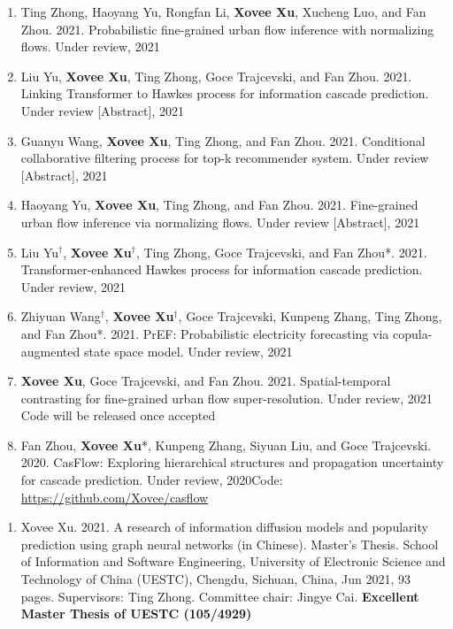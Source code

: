 
\begin{enumerate}[resume]
    \item Ting Zhong, Haoyang Yu, Rongfan Li, \textbf{Xovee Xu}, Xucheng Luo, and Fan Zhou. 2021. Probabilistic fine-grained urban flow inference with normalizing flows. Under review, 2021
    \item Liu Yu, \textbf{Xovee Xu}, Ting Zhong, Goce Trajcevski, and Fan Zhou. 2021. Linking Transformer to Hawkes process for information cascade prediction. Under review [Abstract], 2021
    \item Guanyu Wang, \textbf{Xovee Xu}, Ting Zhong, and Fan Zhou. 2021. Conditional collaborative filtering process for top-k recommender system. Under review [Abstract], 2021
    \item Haoyang Yu, \textbf{Xovee Xu}, Ting Zhong, and Fan Zhou. 2021. Fine-grained urban flow inference via normalizing flows. Under review [Abstract], 2021
    \item Liu Yu$^\dagger$, \textbf{Xovee Xu}$^\dagger$, Ting Zhong, Goce Trajcevski, and Fan Zhou*. 2021. Transformer-enhanced Hawkes process for information cascade prediction. Under review, 2021
    \item Zhiyuan Wang$^\dagger$, \textbf{Xovee Xu}$^\dagger$, Goce Trajcevski, Kunpeng Zhang, Ting Zhong, and Fan Zhou*. 2021. PrEF: Probabilistic electricity forecasting via copula-augmented state space model. Under review, 2021 
    \item \textbf{Xovee Xu}, Goce Trajcevski, and Fan Zhou. 2021. Spatial-temporal contrasting for fine-grained urban flow super-resolution. Under review, 2021 \newline Code will be released once accepted
    \item Fan Zhou, \textbf{Xovee Xu}*, Kunpeng Zhang, Siyuan Liu, and Goce Trajcevski. 2020. CasFlow: Exploring hierarchical structures and propagation uncertainty for cascade prediction. Under review, 2020\newline Code: {\color{gray}\url{https://github.com/Xovee/casflow}}
\end{enumerate}


\begin{enumerate}
    \item Xovee Xu. 2021. A research of information diffusion models and popularity prediction using graph neural networks (in Chinese). Master's Thesis. School of Information and Software Engineering, University of Electronic Science and Technology of China (UESTC), Chengdu, Sichuan, China, Jun 2021, 93 pages. Supervisors: Ting Zhong. Committee chair: Jingye Cai. \newline
    \textbf{\color{red}Excellent Master Thesis of UESTC (105/4929)}
\end{enumerate}

